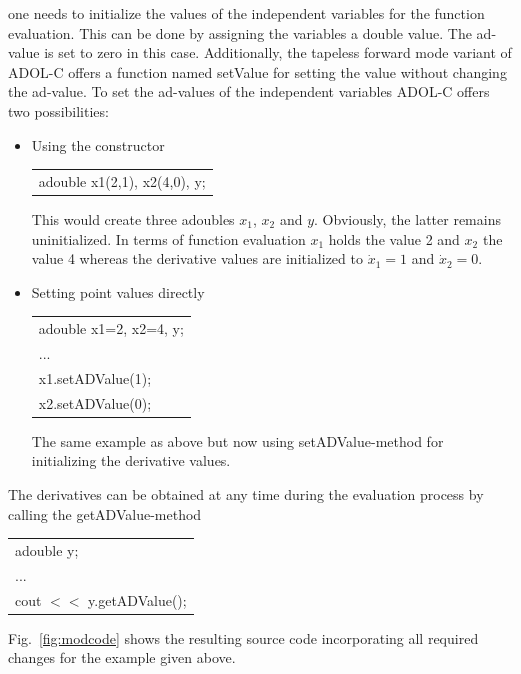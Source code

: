 \documentclass[11pt,twoside]{article}
\begin{document}
one needs to initialize the values of the independent variables for the
function evaluation. This can be done by assigning the variables a {\sf
double} value. The {\sf ad}-value is set to zero in this case. 
Additionally, the tapeless forward mode variant of ADOL-C
offers a function named {\sf setValue} for setting the value without
changing the {\sf ad}-value. To set the {\sf ad}-values of the independent
variables ADOL-C offers two possibilities: 
\begin{itemize}
  \item Using the constructor
        \begin{center}
	  \begin{tabular}{l}
	    {\sf adouble x1(2,1), x2(4,0), y;}
	  \end{tabular}
	\end{center}
	This would create three adoubles $x_1$, $x_2$ and $y$. Obviously, the latter
	remains uninitialized. In terms of function evaluation
	$x_1$ holds the value 2 and $x_2$ the value 4 whereas the derivative values
	are initialized to $\dot{x}_1=1$ and $\dot{x}_2=0$.
   \item Setting point values directly
         \begin{center}
	   \begin{tabular}{l}
	     {\sf adouble x1=2, x2=4, y;}\\
	     ...\\
	     {\sf x1.setADValue(1);}\\
	     {\sf x2.setADValue(0);}
	   \end{tabular}
	 \end{center}
	 The same example as above but now using {\sf setADValue}-method for initializing the derivative values.
\end{itemize}
%
The derivatives can be obtained at any time during the evaluation
process by calling the {\sf getADValue}-method
\begin{center}
  \begin{tabular}{l}
    {\sf adouble y;}\\
    ...\\
    {\sf cout $<<$ y.getADValue();}
  \end{tabular}
\end{center}
Fig.~\ref{fig:modcode} shows the resulting source code incorporating
all required changes for the example
given above.
\end{document}
